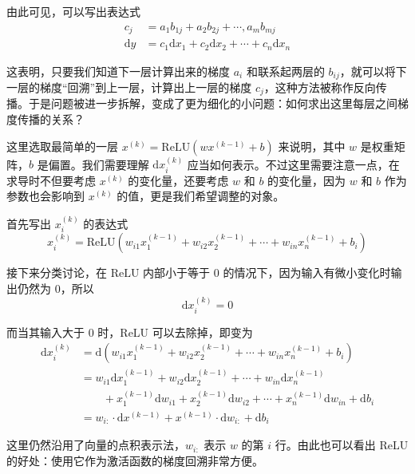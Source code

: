 由此可见，可以写出表达式
\[
\begin{aligned}
    c_j &= a_1 b_{1j} + a_2 b_{2j} + \cdots, a_m b_{mj}\\
    \mathrm{d}y &= c_1 \mathrm{d}x_1 + c_2 \mathrm{d}x_2 + \cdots + c_n \mathrm{d}x_n
\end{aligned}
\]

这表明，只要我们知道下一层计算出来的梯度 $a_i$ 和联系起两层的 $b_{ij}$，就可以将下一层的梯度“回溯”到上一层，计算出上一层的梯度 $c_j$，这种方法被称作反向传播。于是问题被进一步拆解，变成了更为细化的小问题：如何求出这里每层之间梯度传播的关系？

这里选取最简单的一层 $x^{(k)} = \text{ReLU}(w x^{(k-1)} + b)$ 来说明，其中 $w$ 是权重矩阵，$b$ 是偏置。我们需要理解 $\mathrm{d}x^{(k)}_i$ 应当如何表示。不过这里需要注意一点，在求导时不但要考虑 $x^{(k)}$ 的变化量，还要考虑 $w$ 和 $b$ 的变化量，因为 $w$ 和 $b$ 作为参数也会影响到 $x^{(k)}$ 的值，更是我们希望调整的对象。

首先写出 $x^{(k)}_i$ 的表达式
\[
    x^{(k)}_i = \text{ReLU}(w_{i1} x^{(k-1)}_1 + w_{i2} x^{(k-1)}_2 + \cdots + w_{in} x^{(k-1)}_n + b_i)
\]

接下来分类讨论，在 $\text{ReLU}$ 内部小于等于 0 的情况下，因为输入有微小变化时输出仍然为 0，所以
\[
    \mathrm{d}x^{(k)}_i = 0
\]

而当其输入大于 0 时，ReLU 可以去除掉，即变为
\[
\begin{aligned}
    \mathrm{d}x^{(k)}_i &= \mathrm{d}(w_{i1} x^{(k-1)}_1 + w_{i2} x^{(k-1)}_2 + \cdots + w_{in} x^{(k-1)}_n + b_i) \\
    &= w_{i1} \mathrm{d}x^{(k-1)}_1 + w_{i2} \mathrm{d}x^{(k-1)}_2 + \cdots + w_{in} \mathrm{d}x^{(k-1)}_n \\
    &\qquad +x^{(k-1)}_1 \mathrm{d}w_{i1} + x^{(k-1)}_2 \mathrm{d}w_{i2} + \cdots + x^{(k-1)}_n \mathrm{d}w_{in} + \mathrm{d}b_i \\
    &= w_{i:} \cdot \mathrm{d}x^{(k-1)} + x^{(k-1)} \cdot \mathrm{d}w_{i:} + \mathrm{d}b_i
\end{aligned}
\]

这里仍然沿用了向量的点积表示法，$w_{i:}$ 表示 $w$ 的第 $i$ 行。由此也可以看出 ReLU 的好处：使用它作为激活函数的梯度回溯非常方便。

